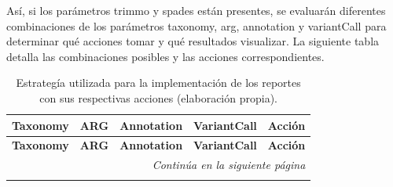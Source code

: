 \documentclass[12pt]{article}
\begin{document}
Así, si los parámetros trimmo y spades están presentes, se evaluarán 
diferentes combinaciones de los parámetros taxonomy, arg, annotation y 
variantCall para determinar qué acciones tomar y qué resultados visualizar.
La siguiente tabla detalla las combinaciones posibles y las acciones 
correspondientes. 

\begin{longtable}{|c|c|c|c|p{6cm}|}
    \caption{Estrategía utilizada para la implementación de los reportes con sus respectivas acciones (elaboración propia).}
    \label{tabla:acciones} \\
    \hline
    \textbf{Taxonomy} & \textbf{ARG} & \textbf{Annotation} & \textbf{VariantCall} & \textbf{Acción} \\
    \hline
    \endfirsthead
    
    \hline
    \textbf{Taxonomy} & \textbf{ARG} & \textbf{Annotation} & \textbf{VariantCall} & \textbf{Acción} \\
    \hline
    \endhead
    
    \hline \multicolumn{5}{r}{\textit{Continúa en la siguiente página}} \\
    \endfoot
    
    \hline
    \endlastfoot
    

\end{longtable}
\end{document}
